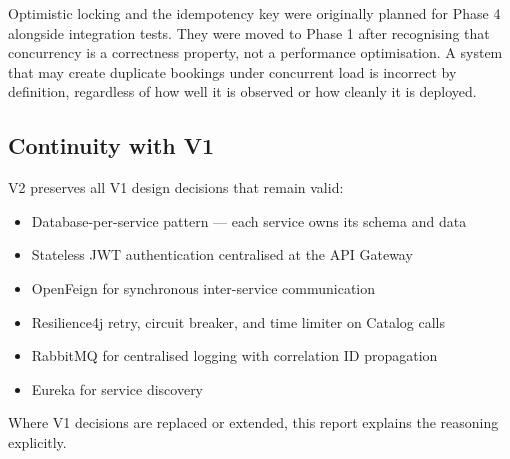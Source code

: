 Optimistic locking and the idempotency key were originally planned for Phase 4 alongside integration tests. They were moved to Phase 1 after recognising that concurrency is a correctness property, not a performance optimisation. A system that may create duplicate bookings under concurrent load is incorrect by definition, regardless of how well it is observed or how cleanly it is deployed.

\subsection{Continuity with V1}

V2 preserves all V1 design decisions that remain valid:

\begin{itemize}
    \item Database-per-service pattern --- each service owns its schema and data
    \item Stateless JWT authentication centralised at the API Gateway
    \item OpenFeign for synchronous inter-service communication
    \item Resilience4j retry, circuit breaker, and time limiter on Catalog calls
    \item RabbitMQ for centralised logging with correlation ID propagation
    \item Eureka for service discovery
\end{itemize}

Where V1 decisions are replaced or extended, this report explains the reasoning explicitly.